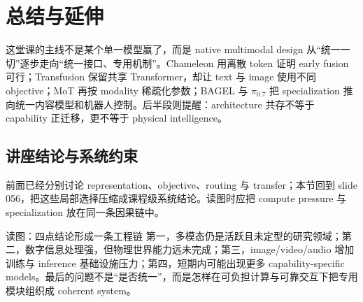 \section{总结与延伸}

这堂课的主线不是某个单一模型赢了，而是 native multimodal design 从“统一一切”逐步走向“统一接口、专用机制”。Chameleon 用离散 token 证明 early fusion 可行；Transfusion 保留共享 Transformer，却让 text 与 image 使用不同 objective；MoT 再按 modality 稀疏化参数；BAGEL 与 $\pi_{0.7}$ 把 specialization 推向统一内容模型和机器人控制。后半段则提醒：architecture 共存不等于 capability 正迁移，更不等于 physical intelligence。

\subsection{讲座结论与系统约束}

前面已经分别讨论 representation、objective、routing 与 transfer；本节回到 slide 056，把这些局部选择压缩成课程级系统结论。读图时应把 compute pressure 与 specialization 放在同一条因果链中。


\begin{knowledgebox}{读图：四点结论形成一条工程链}
第一，多模态仍是活跃且未定型的研究领域；第二，数字信息处理强，但物理世界能力远未完成；第三，image/video/audio 增加训练与 inference 基础设施压力；第四，短期内可能出现更多 capability-specific models。最后的问题不是“是否统一”，而是怎样在可负担计算与可靠交互下把专用模块组织成 coherent system。
\end{knowledgebox}


